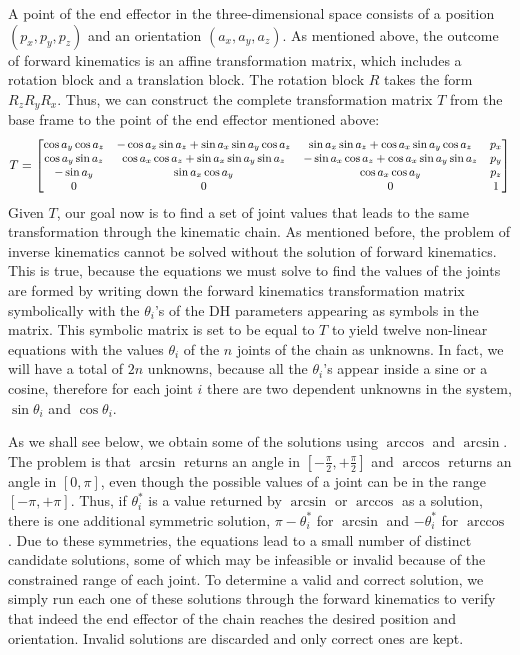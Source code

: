 A point of the end effector in the three-dimensional space consists of a position $(p_x,p_y,p_z)$ and an orientation $(a_x,a_y,a_z)$. As mentioned above, the outcome of forward kinematics is an affine transformation matrix, which includes a rotation block and a translation block. The rotation block $R$ takes the form $R_zR_yR_x$. Thus, we can construct the complete transformation matrix $T$ from the base frame to the point of the end effector mentioned above:
\[
\begin{small}
T = 
\begin{bmatrix}
\cos a_y\cos a_z & -\cos a_x\sin a_z + \sin a_x\sin a_y\cos a_z & \sin a_x\sin a_z + \cos a_x\sin a_y\cos a_z & p_x\\
\cos a_y\sin a_z & \cos a_x\cos a_z + \sin a_x\sin a_y\sin a_z & -\sin a_x\cos a_z + \cos a_x\sin a_y\sin a_z & p_y\\
-\sin a_y & \sin a_x\cos a_y & \cos a_x\cos a_y & p_z\\
0 & 0 & 0 & 1
\end{bmatrix}
\end{small}
\]
Given $T$, our goal now is to find a set of joint values that leads to the same transformation through the kinematic chain. As mentioned before, the problem of inverse kinematics cannot be solved without the solution of forward kinematics. This is true, because the equations we must solve to find the values of the joints are formed by writing down the forward kinematics transformation matrix symbolically with the $\theta_i$'s of the DH parameters appearing as symbols in the matrix. This symbolic matrix is set to be equal to $T$ to yield twelve non-linear equations with the values $\theta_i$ of the $n$ joints of the chain as unknowns. In fact, we will have a total of $2n$ unknowns, because all the $\theta_i$'s appear inside a sine or a cosine, therefore for each joint $i$ there are two dependent unknowns in the system, $\sin\theta_i$ and $\cos\theta_i$.

As we shall see below, we obtain some of the solutions using $\arccos$ and $\arcsin$. The problem is that $\arcsin$ returns an angle in $\left[-\tfrac{\pi}{2},+\tfrac{\pi}{2}\right]$ and $\arccos$ returns an angle in $\left[0,\pi\right]$, even though the possible values of a joint can be in the range $\left[-\pi,+\pi\right]$. Thus, if $\theta^*_i$ is a value returned by $\arcsin$ or $\arccos$ as a solution, there is one additional symmetric solution, $\pi - \theta^*_i$ for $\arcsin$ and $-\theta^*_i$ for $\arccos$. Due to these symmetries, the equations lead to a small number of distinct candidate solutions, some of which may be infeasible or invalid because of the constrained range of each joint. To determine a valid and correct solution, we simply run each one of these solutions through the forward kinematics to verify that indeed the end effector of the chain reaches the desired position and orientation. Invalid solutions are discarded and only correct ones are kept. 

